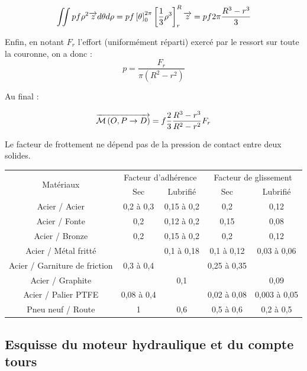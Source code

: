\documentclass[10pt,fleqn]{article} %
\begin{document}
\begin{eqnarray*}
\iint pf\rho^2 \overrightarrow{z} d\theta d\rho =
pf \left[ \theta\right]_{0}^{2\pi}\left[ \dfrac{1}{3}\rho^3\right]_{r}^{R} \overrightarrow{z}
= pf2\pi \dfrac{R^3-r^3}{3} 
\end{eqnarray*} 

Enfin, en notant $F_r$ l'effort (uniformément réparti) exercé par le ressort sur toute la couronne, on a donc :
$$
p=\dfrac{F_r}{\pi \left(R^2-r^2 \right)}
$$

Au final : 

$$ \overrightarrow{\mathcal{M}\left( {O}, {P} \rightarrow {D}\right)}  
= f\dfrac{2}{3} \dfrac{R^3-r^3}{R^2-r^2} F_r
$$


Le facteur de frottement ne dépend pas de la pression de contact entre deux solides.

\begin{center}
\begin{tabular}{|c||c|c||c|c|}
\hline
\multirow{2}{*}{Matériaux} 
& \multicolumn{2}{c||}{Facteur d'adhérence} & \multicolumn{2}{c|}{Facteur de glissement} \\
\cline{2-5}
& Sec & Lubrifié & Sec & Lubrifié \\
\hline
\hline
Acier / Acier & 0,2 à 0,3 & 0,15 à 0,2 & 0,2 & 0,12 \\ \hline
Acier / Fonte & 0,2 & 0,12 à 0,2 & 0,15 & 0,08 \\ \hline
Acier / Bronze & 0,2 & 0,15 à 0,2 & 0,2 & 0,12 \\ \hline
Acier / Métal fritté &  & 0,1 à 0,18 & 0,1 à 0,12 & 0,03 à 0,06 \\ \hline
Acier / Garniture de friction & 0,3 à 0,4 &  & 0,25 à 0,35 &  \\ \hline
Acier / Graphite &  & 0,1 &  & 0,09 \\ \hline
Acier / Palier PTFE & 0,08 à 0,4 &  & 0,02 à 0,08 & 0,003 à 0,05 \\ \hline
Pneu neuf / Route & 1 & 0,6  & 0,5 à 0,6  & 0,2 à 0,5\\ \hline
\end{tabular}
\end{center}



\subsection*{Esquisse du moteur hydraulique et du compte tours}
\end{document}
